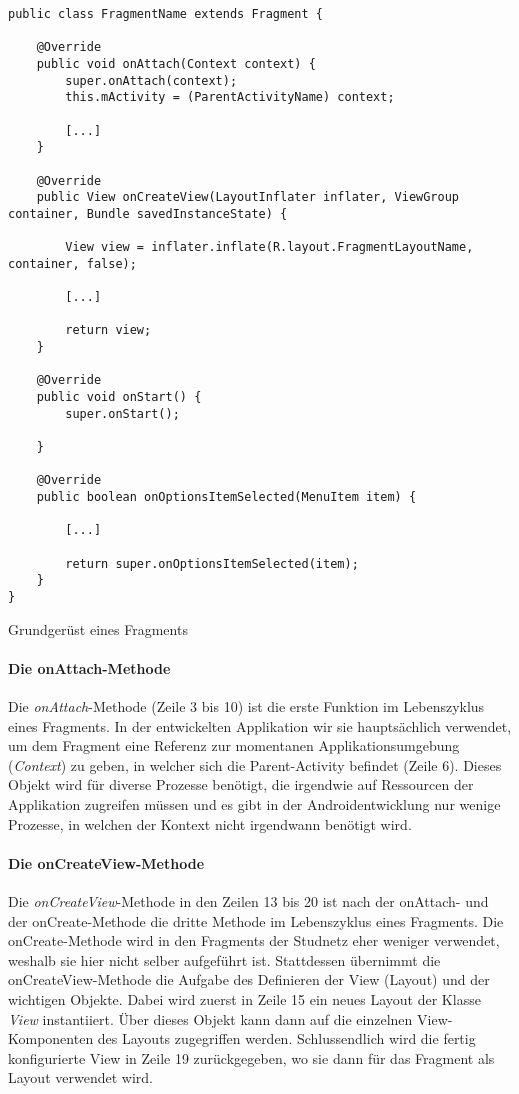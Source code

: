 \documentclass[../main.tex]{subfiles}
\begin{document}
	\begin{code}
		\begin{center}
			\begin{verbatim}
public class FragmentName extends Fragment {
			
	@Override
	public void onAttach(Context context) {
		super.onAttach(context);
		this.mActivity = (ParentActivityName) context;
		
		[...]
	}
	
	@Override
	public View onCreateView(LayoutInflater inflater, ViewGroup container, Bundle savedInstanceState) {
	
		View view = inflater.inflate(R.layout.FragmentLayoutName, container, false);

		[...]

		return view;
	}
			
	@Override
	public void onStart() {
		super.onStart();
	
	}
			
	@Override
	public boolean onOptionsItemSelected(MenuItem item) {
			
		[...]
			
		return super.onOptionsItemSelected(item);
	}
}	
			\end{verbatim}
			\caption{Grundgerüst eines Fragments}
			\label{fragmentStructure}
		\end{center}
		
	\end{code}

	\paragraph{Die onAttach-Methode}
	Die \emph{onAttach}-Methode (Zeile 3 bis 10) ist die erste Funktion im Lebenszyklus eines Fragments. In der entwickelten Applikation wir sie hauptsächlich verwendet, um dem Fragment eine Referenz zur momentanen Applikationsumgebung (\emph{Context}) zu geben, in welcher sich die Parent-Activity befindet (Zeile 6). Dieses Objekt wird für diverse Prozesse benötigt, die irgendwie auf Ressourcen der Applikation zugreifen müssen und es gibt in der Androidentwicklung nur wenige Prozesse, in welchen der Kontext nicht irgendwann benötigt wird. \cite{context}
	
	\paragraph{Die onCreateView-Methode}
	Die \emph{onCreateView}-Methode in den Zeilen 13 bis 20 ist nach der onAttach- und der onCreate-Methode die dritte Methode im Lebenszyklus eines Fragments. Die onCreate-Methode wird in den Fragments der Studnetz eher weniger verwendet, weshalb sie hier nicht selber aufgeführt ist. Stattdessen übernimmt die onCreateView-Methode die Aufgabe des Definieren der View (Layout) und der wichtigen Objekte. Dabei wird zuerst in Zeile 15 ein neues Layout der Klasse \emph{View} instantiiert. Über dieses Objekt kann dann auf die einzelnen View-Komponenten des Layouts zugegriffen werden. Schlussendlich wird die fertig konfigurierte View in Zeile 19 zurückgegeben, wo sie dann für das Fragment als Layout verwendet wird.
	
\end{document}
